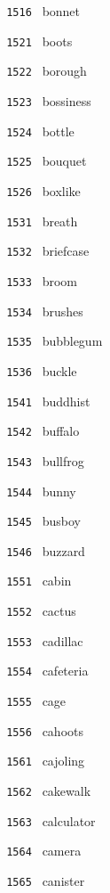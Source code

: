 \documentclass[11pt]{article}
\begin{document}
\begin{multicols}{6}
\noindent \texttt{ 1516 } bonnet  \par
\vspace{3mm}
\noindent \texttt{ 1521 } boots  \par
\noindent \texttt{ 1522 } borough  \par
\noindent \texttt{ 1523 } bossiness  \par
\noindent \texttt{ 1524 } bottle  \par
\noindent \texttt{ 1525 } bouquet  \par
\noindent \texttt{ 1526 } boxlike  \par
\vspace{3mm}
\noindent \texttt{ 1531 } breath  \par
\noindent \texttt{ 1532 } briefcase  \par
\noindent \texttt{ 1533 } broom  \par
\noindent \texttt{ 1534 } brushes  \par
\noindent \texttt{ 1535 } bubblegum  \par
\noindent \texttt{ 1536 } buckle  \par
\vspace{3mm}
\noindent \texttt{ 1541 } buddhist  \par
\noindent \texttt{ 1542 } buffalo  \par
\noindent \texttt{ 1543 } bullfrog  \par
\noindent \texttt{ 1544 } bunny  \par
\noindent \texttt{ 1545 } busboy  \par
\noindent \texttt{ 1546 } buzzard  \par
\vspace{3mm}
\noindent \texttt{ 1551 } cabin  \par
\noindent \texttt{ 1552 } cactus  \par
\noindent \texttt{ 1553 } cadillac  \par
\noindent \texttt{ 1554 } cafeteria  \par
\noindent \texttt{ 1555 } cage  \par
\noindent \texttt{ 1556 } cahoots  \par
\vspace{3mm}
\noindent \texttt{ 1561 } cajoling  \par
\noindent \texttt{ 1562 } cakewalk  \par
\noindent \texttt{ 1563 } calculator  \par
\noindent \texttt{ 1564 } camera  \par
\noindent \texttt{ 1565 } canister  \par

\end{multicols}
\end{document}
